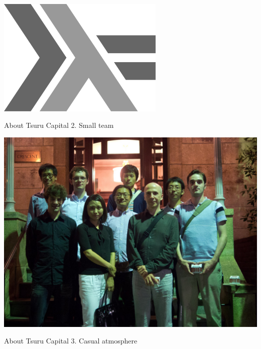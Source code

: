 \documentclass[20pt]{beamer}
\begin{document}
\begin{frame}[plain]
    \begin{center}
    \includegraphics[width=0.6\textwidth]{images/haskell.pdf}
    \end{center}
\end{frame}

\begin{frame}{About Tsuru Capital}
    2. Small team \\
\end{frame}

\begin{frame}[plain]
    \includegraphics[width=\textwidth]{images/group-picture.jpg}
\end{frame}

\begin{frame}{About Tsuru Capital}
    3. Casual atmosphere
\end{frame}
\end{document}
